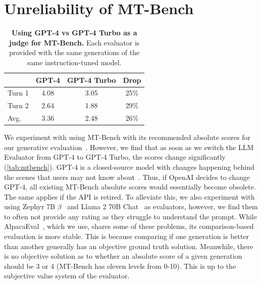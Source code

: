 \documentclass{article}
\newcommand{\llama}{Llama}
\begin{document}
\FloatBarrier

\section{Unreliability of MT-Bench}
\label{sec:mtbench}

\begin{table}
\caption{\textbf{Using GPT-4 vs GPT-4 Turbo as a judge for MT-Bench.} Each evaluator is provided with the same generations of the same instruction-tuned model.}
\begin{tabular}{l|cc|c}
\toprule
& GPT-4 & GPT-4 Turbo & Drop \\
\midrule
Turn 1 & 4.08 & 3.05 & 25\% \\
Turn 2 & 2.64 & 1.88 & 29\% \\
\midrule
Avg. & 3.36 & 2.48 & 26\% \\
\bottomrule
\end{tabular}
\label{tab:mtbench}
\end{table}

We experiment with using MT-Bench with its recommended absolute scores for our generative evaluation~\cite{zheng2023judging}. However, we find that as soon as we switch the LLM Evaluator from GPT-4 to GPT-4 Turbo, the scores change significantly (\autoref{tab:mtbench}). GPT-4 is a closed-source model with changes happening behind the scenes that users may not know about~\cite{chen2023chatgpts}. Thus, if OpenAI decides to change GPT-4, all existing MT-Bench absolute scores would essentially become obsolete. The same applies if the API is retired. To alleviate this, we also experiment with using Zephyr 7B $\beta$~\cite{tunstall2023zephyr} and \llama{} 2 70B Chat~\cite{touvron2023llama} as evaluators, however, we find them to often not provide any rating as they struggle to understand the prompt. While AlpacaEval~\cite{dubois2023alpacafarm,alpaca_eval}, which we use, shares some of these problems, its comparison-based evaluation is more stable. This is because comparing if one generation is better than another generally has an objective ground truth solution. Meanwhile, there is no objective solution as to whether an absolute score of a given generation should be 3 or 4 (MT-Bench has eleven levels from 0-10). This is up to the subjective value system of the evaluator.
\end{document}
